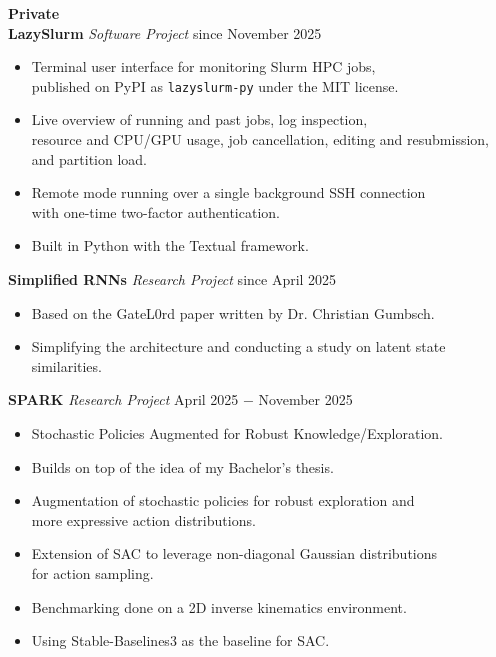 \documentclass{article}
\begin{document}
\vspace{0.5cm}
\noindent \textbf{Private} \\

\noindent \textbf{LazySlurm} \textit{Software Project} \href{https://github.com/RobinU434/LazySlurm}{\faGithubSquare} \hfill since November 2025
\begin{itemize}[noitemsep,nolistsep,leftmargin=*]
    \item Terminal user interface for monitoring Slurm HPC jobs, \\
    published on PyPI as \texttt{lazyslurm-py} under the MIT license.
    \item Live overview of running and past jobs, log inspection, \\
    resource and CPU/GPU usage, job cancellation, editing and resubmission, \\
    and partition load.
    \item Remote mode running over a single background SSH connection \\
    with one-time two-factor authentication.
    \item Built in Python with the Textual framework.\\
\end{itemize}

\noindent \textbf{Simplified RNNs} \textit{Research Project} \hfill since April 2025
\begin{itemize}[noitemsep,nolistsep,leftmargin=*]
    \item Based on the GateL0rd paper written by Dr. Christian Gumbsch.
    \item Simplifying the architecture and conducting a study on latent state similarities.\\
\end{itemize}


\noindent \textbf{SPARK} \textit{Research Project} \href{https://github.com/RobinU434/SPARK}{\faGithubSquare} \hfill April 2025 $-$ November 2025
\begin{itemize}[noitemsep,nolistsep,leftmargin=*]
    \item Stochastic Policies Augmented for Robust Knowledge/Exploration.
    \item Builds on top of the idea of my Bachelor's thesis.
    \item Augmentation of stochastic policies for robust exploration and \\
    more expressive action distributions.
    \item Extension of SAC to leverage non-diagonal Gaussian distributions \\
    for action sampling.
    \item Benchmarking done on a 2D inverse kinematics environment.
    \item Using Stable-Baselines3 as the baseline for SAC. \\
\end{itemize}
\end{document}
